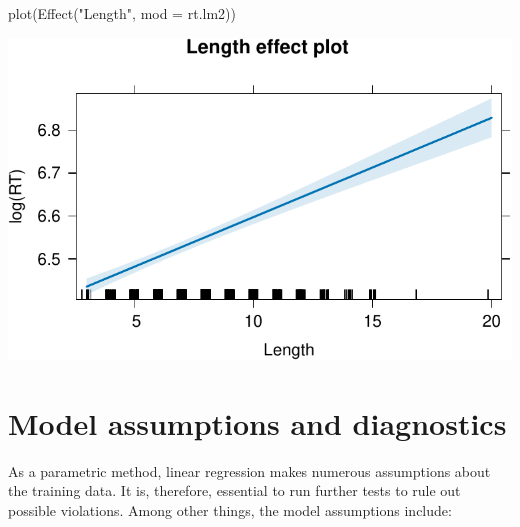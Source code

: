 \documentclass[
  11pt,
  letterpaper,
  DIV=11,
  numbers=noendperiod]{scrreprt}
\newenvironment{Shaded}{\begin{snugshade}}{\end{snugshade}}
\newcommand{\AttributeTok}[1]{\textcolor[rgb]{0.40,0.45,0.13}{#1}}
\newcommand{\FunctionTok}[1]{\textcolor[rgb]{0.28,0.35,0.67}{#1}}
\newcommand{\NormalTok}[1]{\textcolor[rgb]{0.00,0.23,0.31}{#1}}
\newcommand{\StringTok}[1]{\textcolor[rgb]{0.13,0.47,0.30}{#1}}
\begin{document}
\begin{Shaded}
\begin{Highlighting}[]
\FunctionTok{plot}\NormalTok{(}\FunctionTok{Effect}\NormalTok{(}\StringTok{"Length"}\NormalTok{, }\AttributeTok{mod =}\NormalTok{ rt.lm2))}
\end{Highlighting}
\end{Shaded}

\includegraphics{Linear_regression_files/figure-pdf/unnamed-chunk-12-3.pdf}

\section{Model assumptions and
diagnostics}\label{model-assumptions-and-diagnostics}

As a parametric method, linear regression makes numerous assumptions
about the training data. It is, therefore, essential to run further
tests to rule out possible violations. Among other things, the model
assumptions include:
\end{document}
